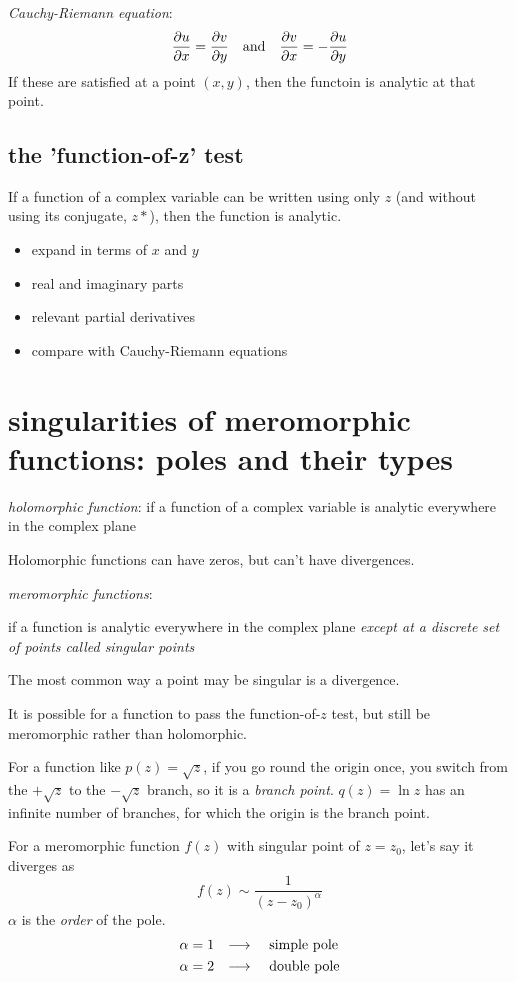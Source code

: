 \documentclass[10pt, a4paper, twocolumn]{article}
\newcommand{\deff}[1]{\par \noindent \textit{#1}: }
\newcommand{\arr}{\ensuremath{\longrightarrow\ }}
\begin{document}
\deff{Cauchy-Riemann equation}
\[\pdv{u}{x}=\pdv{v}{y}
\qq{and} \pdv{v}{x}=-\pdv{u}{y}\]
If these are satisfied at a point $(x,y)$, then the functoin is analytic at that point.

\subsection{the 'function-of-z' test}
If a function of a complex variable can be written using only $z$ (and without using its conjugate, $z*$), then the function is analytic.

\begin{itemize}
\item expand in terms of $x$ and $y$
\item real and imaginary parts
\item relevant partial derivatives
\item compare with Cauchy-Riemann equations
\end{itemize}

\section{singularities of meromorphic functions: poles and their types}

\deff{holomorphic function}
if a function of a complex variable is analytic everywhere in the complex plane

Holomorphic functions can have zeros, but can't have divergences.

\deff{meromorphic functions}

if a function is analytic everywhere in the complex plane \emph{except at a discrete set of points called singular points}

The most common way a point may be singular is a divergence.

It is possible for a function to pass the function-of-$z$ test, but still be meromorphic rather than holomorphic.

For a function like $p(z)=\sqrt z$, if you go round the origin once, you switch from the $+\sqrt z$ to the $-\sqrt z$ branch, so it is a \emph{branch point}. $q(z)=\ln z$ has an infinite number of branches, for which the origin is the branch point.

For a meromorphic function $f(z)$ with singular point of $z=z_0$, let's say it diverges as
\[f(z)\sim\frac{1}{(z-z_0)^\alpha}\]
$\alpha$ is the \emph{order} of the pole.
\begin{equation*}
\begin{aligned}
\alpha&=1\qq{\arr}\text{simple pole}
\\ \alpha&=2\qq{\arr}\text{double pole}
\end{aligned}
\end{equation*}
\end{document}
